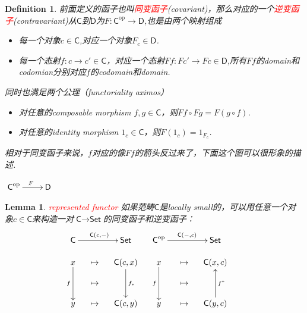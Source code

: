 \documentclass{article}
\newtheorem{lemma}[theorem]{Lemma}
\newtheorem{definition}[theorem]{Definition}
\newcommand*{\cat}[1]{\textsf{#1}\xspace}
\newcommand{\Set}{\textsf{Set}\xspace}
\newcommand{\op}{\textrm{op}}
\newcommand{\redt}[1]{\textcolor{red}{#1}}
\begin{document}
\begin{definition}
\rm 前面定义的函子也叫\redt{同变函子}(covariant)，那么对应的一个\redt{逆变函子}(contravariant)从$\cat{C}$到$\cat{D}$为$F: \cat{C}^{\op} \rightarrow \cat{D} $,也是由两个映射组成
\begin{itemize}
	\item 每一个对象$c \in \cat{C}$,对应一个对象$F_c \in \cat{D}$.
	\item 每一个态射$f \colon c \rightarrow	c' \in \cat{C}$，对应一个态射$Ff \colon Fc' \rightarrow Fc \in \cat{D}$,所有$Ff$的domain和codomian分别对应$f$的codomain和domain.
\end{itemize}
同时也满足两个公理（functoriality aximos）
\begin{itemize}
	\item 对任意的composable morphism $f,g \in \cat{C}$，则$Ff \circ Fg = F(g \circ f)$.
	\item 对任意的identity morphism $1_c \in \cat{C}$，则$F(1_c)=1_{F_c}$.
\end{itemize}
相对于同变函子来说，$f$对应的像$Ff$的箭头反过来了，下面这个图可以很形象的描述.
\begin{center}
$\xymatrix{\cat{C}^{\op}\ar[r]^F&\cat{D}}$ \\
\end{center} 
\end{definition}	

\begin{lemma}
\rm \redt{represented functor}  如果范畴$\cat{C}$是locally small的，可以用任意一个对象$c \in \cat{C}$来构造一对$\cat{C} \to \Set$的同变函子和逆变函子：
\[
	\xymatrix@-1pc{
	\cat{C}\ar[rr]^{\cat{C}(c,-)} & & \Set & \cat{C}^\op \ar^{\cat{C}(-,c)}[rr] & & \Set \\
	x\ar[dd]_{f} & \mapsto & \cat{C}(c,x)\ar[dd]^{f_*} & x\ar[dd]_{f} & \mapsto & \cat{C}(x,c) \\
	  &\mapsto & & & \mapsto & &\\
	y & \mapsto & \cat{C}(c,y) & y & \mapsto & \cat{C}(y,c)\ar[uu]_{f^*} \\
	}
	\]
\end{lemma}
\end{document}
